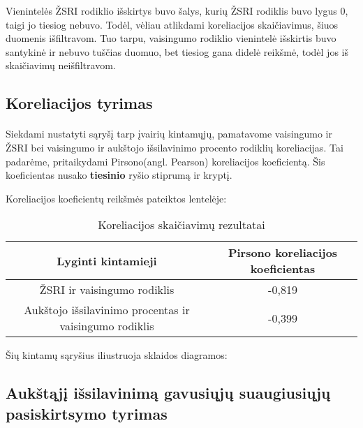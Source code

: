 Vienintelės ŽSRI rodiklio išskirtys buvo šalys, kurių ŽSRI rodiklis buvo lygus 0, taigi jo tiesiog nebuvo. Todėl, vėliau atlikdami koreliacijos skaičiavimus, šiuos duomenis išfiltravom. Tuo tarpu, vaisingumo rodiklio vienintelė išskirtis buvo santykinė ir nebuvo tuščias duomuo, bet tiesiog gana didelė reikšmė, todėl jos iš skaičiavimų neišfiltravom.

\pagebreak


\subsection{Koreliacijos tyrimas}
\paragraph{} Siekdami nustatyti sąryšį tarp įvairių kintamųjų, pamatavome vaisingumo ir ŽSRI bei vaisingumo ir aukštojo išsilavinimo procento rodiklių koreliacijas. Tai padarėme, pritaikydami Pirsono(angl. Pearson) koreliacijos koeficientą. Šis koeficientas nusako \textbf{tiesinio} ryšio stiprumą ir kryptį.

Koreliacijos koeficientų reikšmės pateiktos lentelėje:
\begin{table}[H]
\begin{center}
    \caption{Koreliacijos skaičiavimų rezultatai}
    \begin{tabular}{|c|c|}
        \hline
        \textbf{Lyginti kintamieji} & \textbf{Pirsono koreliacijos koeficientas} \\\hline
        ŽSRI ir vaisingumo rodiklis & -0,819 \\\hline
        Aukštojo išsilavinimo procentas ir vaisingumo rodiklis & -0,399 \\\hline
    \end{tabular}
\end{center}
\end{table}

Šių kintamų sąryšius iliustruoja sklaidos diagramos:
\begin{multicols}{2}
\end{multicols}

\pagebreak

\subsection{Aukštąjį išsilavinimą gavusiųjų suaugiusiųjų pasiskirtsymo tyrimas} 

